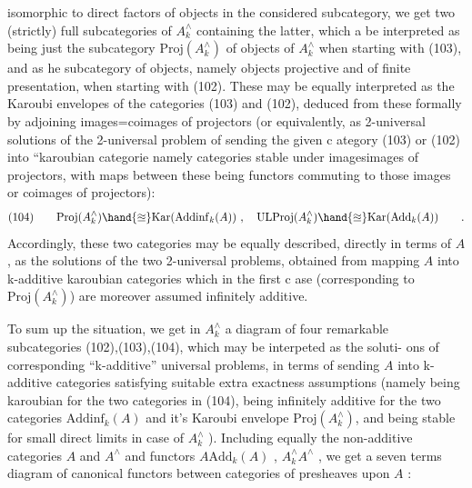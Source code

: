 
isomorphic to direct factors of objects in the considered subcategory,
we get two (strictly) full subcategories of $A^\wedge_k$ containing the latter,
which a be interpreted as being just the  subcategory
$\mathrm{Proj}(A^\wedge_k)$ of \hand{\uline{\textcolor{black}{projective}}} objects of $A^\wedge_k$ when starting with (103), and as
he subcategory  of \hand{\uline{\textcolor{black}{ultraprojective}}} objects, namely objects projective and
of finite presentation, when starting with (102). These may be equally
interpreted as the  Karoubi envelopes of the categories (103) and (102),
deduced from these formally by adjoining images\hand{(}=coimages\hand{)} of projectors
(or equivalently, as 2-universal solutions of the 2-universal problem
of sending the given c ategory (103) or (102) into ``karoubian categorie
namely categories stable under images\hand{(}\over{=}{=}images\hand{)} of projectors, with maps
between these being functors commuting to those images or coimages of
projectors):
\[
\text{(104)}\qquad \mathrm{Proj}(A^\wedge_k)\hand{\approxeq}\mathrm{Kar}(\mathrm{Addinf}_k(A))\ ,\quad \mathrm{ULProj}(A^\wedge_k)\hand{\approxeq}\mathrm{Kar}(\mathrm{Add}_k(A))\qquad .
\]
Accordingly, these two categories may be equally described, directly in
terms of $A$, as the solutions of the two 2-universal problems, obtained
from mapping $A$ into k-additive  karoubian categories\hand{,} which in
the first c ase (corresponding  to $\mathrm{Proj}(A^\wedge_k)$) are moreover
assumed infinitely additive.

To sum up the situation, we get in $A^\wedge_k$ a diagram of four remarkable
 subcategories (102),(103),(104), which may be interpeted  as the soluti-%
ons of  corresponding  ``k-additive'' universal problems, in
terms of sending $A$ into k-additive categories satisfying suitable extra
exactness assumptions (namely being karoubian for the two categories in
(104), being infinitely additive for the two categories $\mathrm{Addinf}_k(A)$ and
it's Karoubi envelope $\mathrm{Proj}(A^\wedge_k)$, and being stable for small direct limits
in case of $A^\wedge_k$ ). Including equally the non-additive categories $A$ and $A^\wedge$
and  functors $A$\hand{$\longrightarrow$}$\mathrm{Add}_k(A)$ , $A^\wedge_k$\hand{$\longrightarrow$}$A^\wedge$ , we get a seven terms diagram of
canonical functors between categories of presheaves upon $A$ :

